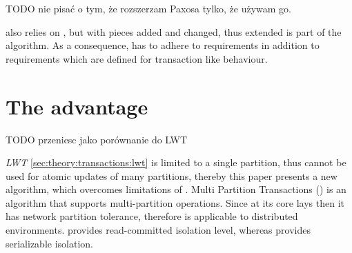 
TODO nie pisać o tym, że rozszerzam Paxosa tylko, że używam go.

\mpt also relies on \paxos, but with pieces added and changed, thus extended
\paxos is part of the \mpt algorithm. As a consequence, \mpt has to adhere to \paxos requirements in addition to requirements which are defined for transaction like behaviour. 

\section{The advantage}
TODO przeniesc jako porównanie do LWT

\emph{LWT} \ref{sec:theory:transactions:lwt} is limited to a single partition, thus \lwt cannot be used for atomic updates of many partitions, thereby this paper presents a new algorithm, which overcomes limitations of \lwt.
Multi Partition Transactions (\mpt) is an algorithm that supports multi-partition operations. Since at its core lays \paxos then it has network partition tolerance, therefore is applicable to distributed environments. \mpt provides read-committed isolation level, whereas \lwt provides serializable isolation.